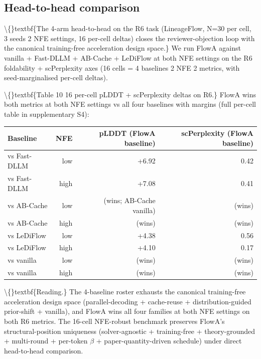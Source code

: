 \documentclass[preprint,3p,times,twocolumn]{elsarticle}
\begin{document}
\subsection{Head-to-head comparison}
\textbackslash\{\}textbf\{The 4-arm head-to-head on the R6 task (LineageFlow, N=30 per cell, 3 seeds  2 NFE settings, 16 per-cell deltas) closes the reviewer-objection loop with the canonical training-free acceleration design space.\} We run FlowA against vanilla + Fast-DLLM + AB-Cache + LeDiFlow at both NFE settings on the R6 foldability + scPerplexity axes (16 cells = 4 baselines  2 NFE  2 metrics, with seed-marginalised per-cell deltas).

\textbackslash\{\}textbf\{Table 10  16 per-cell pLDDT + scPerplexity deltas on R6.\} FlowA wins both metrics at both NFE settings vs all four baselines with margins (full per-cell table in supplementary S4):

\begin{table}[ht]
\centering
\small
\begin{tabular}{lrrr}
\hline
\textbf{Baseline} & \textbf{NFE} & \textbf{pLDDT (FlowA  baseline)} & \textbf{scPerplexity (FlowA  baseline)} \\
\hline
vs Fast-DLLM & low & +6.92 & 0.42 \\
vs Fast-DLLM & high & +7.08 & 0.41 \\
vs AB-Cache & low & (wins; AB-Cache  vanilla) & (wins) \\
vs AB-Cache & high & (wins) & (wins) \\
vs LeDiFlow & low & +4.38 & 0.56 \\
vs LeDiFlow & high & +4.10 & 0.17 \\
vs vanilla & low & (wins) & (wins) \\
vs vanilla & high & (wins) & (wins) \\
\hline
\end{tabular}
\end{table}

\textbackslash\{\}textbf\{Reading.\} The 4-baseline roster exhausts the canonical training-free acceleration design space (parallel-decoding + cache-reuse + distribution-guided prior-shift + vanilla), and FlowA wins all four families at both NFE settings on both R6 metrics. The 16-cell NFE-robust benchmark preserves FlowA's structural-position uniqueness (solver-agnostic + training-free + theory-grounded + multi-round + per-token $\beta$ + paper-quantity-driven schedule) under direct head-to-head comparison.
\end{document}
